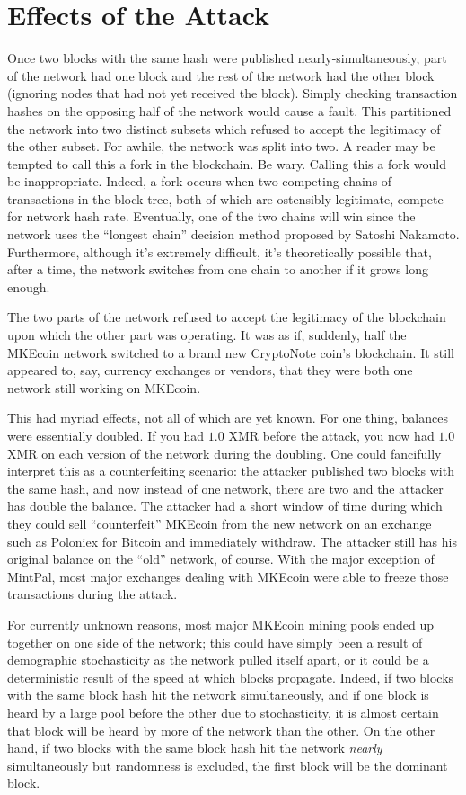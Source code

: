 \documentclass{mrl}
\begin{document}
\section{Effects of the Attack}

Once two blocks with the same hash were published nearly-simultaneously, part of the network had one block and the rest of the network had the other block (ignoring nodes that had not yet received the block). Simply checking transaction hashes on the opposing half of the network would cause a fault. This partitioned the network into two distinct subsets which refused to accept the legitimacy of the other subset. For awhile, the network was split into two. A reader may be tempted to call this a fork in the blockchain. Be wary. Calling this a fork would be inappropriate. Indeed, a fork occurs when two competing chains of transactions in the block-tree, both of which are ostensibly legitimate, compete for network hash rate. Eventually, one of the two chains will win since the network uses the ``longest chain'' decision method proposed by Satoshi Nakamoto. Furthermore, although it's extremely difficult, it's theoretically possible that, after a time, the network switches from one chain to another if it grows long enough.

The two parts of the network refused to accept the legitimacy of the blockchain upon which the other part was operating. It was as if, suddenly, half the MKEcoin network switched to a brand new CryptoNote coin's blockchain. It still appeared to, say, currency exchanges or vendors, that they were both one network still working on MKEcoin.

This had myriad effects, not all of which are yet known. For one thing, balances were essentially doubled. If you had $1.0$ XMR before the attack, you now had $1.0$ XMR on each version of the network during the doubling. One could fancifully interpret this as a counterfeiting scenario: the attacker published two blocks with the same hash, and now instead of one network, there are two and the attacker has double the balance. The attacker had a short window of time during which they could sell ``counterfeit'' MKEcoin from the new network on an exchange such as Poloniex for Bitcoin and immediately withdraw. The attacker still has his original balance on the ``old'' network, of course. With the major exception of MintPal, most major exchanges dealing with MKEcoin were able to freeze those transactions during the attack.

For currently unknown reasons, most major MKEcoin mining pools ended up together on one side of the network; this could have simply been a result of demographic stochasticity as the network pulled itself apart, or it could be a deterministic result of the speed at which blocks propagate. Indeed, if two blocks with the same block hash hit the network simultaneously, and if one block is heard by a large pool before the other due to stochasticity, it is almost certain that block will be heard by more of the network than the other.  On the other hand, if two blocks with the same block hash hit the network \emph{nearly} simultaneously but randomness is excluded, the first block will be the dominant block. 
\end{document}
